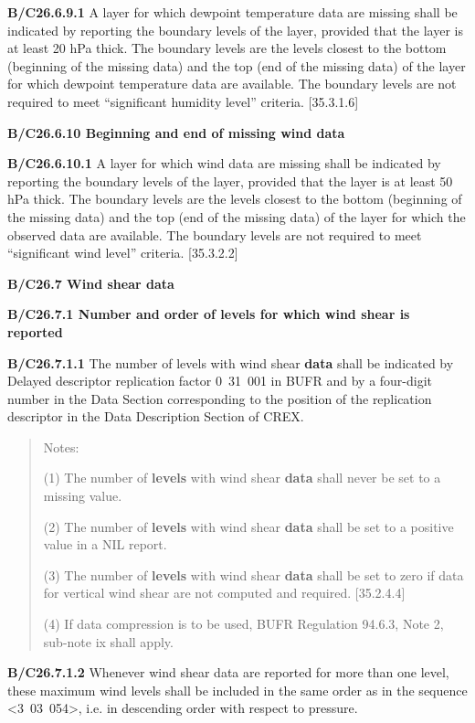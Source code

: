 \textbf{B/C26.6.9.1} A layer for which dewpoint temperature data are missing shall be indicated by reporting the boundary levels of the layer, provided that the layer is at least 20 hPa thick. The boundary levels are the levels closest to the bottom (beginning of the missing data) and the top (end of the missing data) of the layer for which dewpoint temperature data are available. The boundary levels are not required to meet ``significant humidity level'' criteria. {[}35.3.1.6{]}

\textbf{B/C26.6.10 Beginning and end of missing wind data}

\textbf{B/C26.6.10.1} A layer for which wind data are missing shall be indicated by reporting the boundary levels of the layer, provided that the layer is at least 50 hPa thick. The boundary levels are the levels closest to the bottom (beginning of the missing data) and the top (end of the missing data) of the layer for which the observed data are available. The boundary levels are not required to meet ``significant wind level'' criteria. {[}35.3.2.2{]}

\textbf{B/C26.7 Wind shear data}

\textbf{B/C26.7.1 Number and order of levels for which wind shear is reported}

\textbf{B/C26.7.1.1} The number of levels with wind shear \textbf{data} shall be indicated by Delayed descriptor replication factor 0~31~001 in BUFR and by a four-digit number in the Data Section corresponding to the position of the replication descriptor in the Data Description Section of CREX.

\begin{quote}
Notes:

(1) The number of \textbf{levels} with wind shear \textbf{data} shall never be set to a missing value.

(2) The number of \textbf{levels} with wind shear \textbf{data} shall be set to a positive value in a NIL report.

(3) The number of \textbf{levels} with wind shear \textbf{data} shall be set to zero if data for vertical wind shear are not computed and required. {[}35.2.4.4{]}

(4) If data compression is to be used, BUFR Regulation 94.6.3, Note 2, sub-note ix shall apply.
\end{quote}

\textbf{B/C26.7.1.2} Whenever wind shear data are reported for more than one level, these maximum wind levels shall be included in the same order as in the sequence \textless3~03~054\textgreater, i.e. in descending order with respect to pressure.

